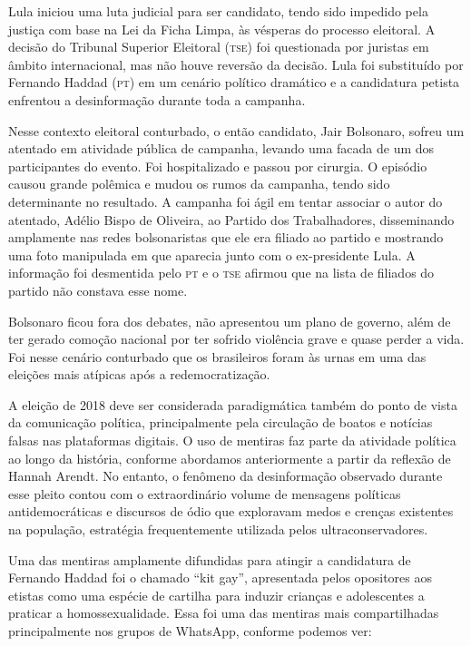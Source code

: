 Lula iniciou uma luta judicial para ser candidato, tendo sido impedido
pela justiça com base na Lei da Ficha Limpa, às vésperas do processo
eleitoral. A decisão do Tribunal Superior Eleitoral (\textsc{tse}) foi questionada por
juristas em âmbito internacional, mas não houve reversão da decisão.
Lula foi substituído por Fernando Haddad (\textsc{pt}) em um cenário político
dramático e a candidatura petista enfrentou a desinformação durante toda a
campanha.

Nesse contexto eleitoral conturbado, o então candidato, Jair Bolsonaro,
sofreu um atentado em atividade pública de campanha, levando uma facada
de um dos participantes do evento. Foi hospitalizado e passou por
cirurgia. O episódio causou grande polêmica e mudou os rumos da
campanha, tendo sido determinante no resultado. A campanha foi ágil em
tentar associar o autor do atentado, Adélio Bispo de Oliveira, ao
Partido dos Trabalhadores, disseminando amplamente nas redes
bolsonaristas que ele era filiado ao partido e mostrando uma foto
manipulada em que aparecia junto com o ex-presidente Lula. A informação
foi desmentida pelo \textsc{pt} e o \textsc{tse} afirmou que na
lista de filiados do partido não constava esse nome.

Bolsonaro ficou fora dos debates, não apresentou um plano de governo,
além de ter gerado comoção nacional por ter sofrido violência grave e
quase perder a vida. Foi nesse cenário conturbado que os brasileiros
foram às urnas em uma das eleições mais atípicas após a redemocratização.

A eleição de 2018 deve ser considerada paradigmática também do ponto de
vista da comunicação política, principalmente pela circulação de boatos
e notícias falsas nas plataformas digitais. O uso de mentiras faz parte
da atividade política ao longo da história, conforme abordamos
anteriormente a partir da reflexão de Hannah Arendt. No entanto, o
fenômeno da desinformação observado durante esse pleito contou com o
extraordinário volume de mensagens políticas antidemocráticas e discursos de
ódio que exploravam medos e crenças existentes na população, estratégia
frequentemente utilizada pelos ultraconservadores.

Uma das mentiras amplamente difundidas para atingir a candidatura de
Fernando Haddad foi o chamado ``kit gay'', apresentada pelos opositores
aos etistas como uma espécie de cartilha para induzir crianças e
adolescentes a praticar a homossexualidade. Essa foi uma das mentiras
mais compartilhadas principalmente nos grupos de WhatsApp, conforme
podemos ver:

